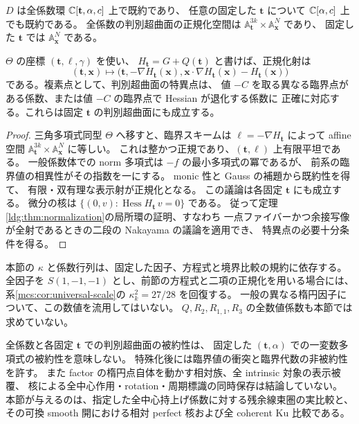 \begin{corollary}
\label{euk:cor:normalization}
$D$ は全係数環 $\mathbb C[\mathbf t,\alpha,c]$ 上で既約であり、
任意の固定した $\mathbf t$ について $\mathbb C[\alpha,c]$ 上でも既約である。
全係数の判別超曲面の正規化空間は
$\mathbb A^{3k}_{\mathbf t}\times\mathbb A^N_{\mathbf x}$ であり、
固定した $\mathbf t$ では $\mathbb A^N_{\mathbf x}$ である。

$\Theta$ の座標 $(\mathbf t,\ell,\gamma)$ を使い、
$H_{\mathbf t}=G+Q(\mathbf t)$ と書けば、正規化射は
\[
 (\mathbf t,\mathbf x)\longmapsto
 \bigl(\mathbf t,-\nabla H_{\mathbf t}(\mathbf x),
       \mathbf x\cdot\nabla H_{\mathbf t}(\mathbf x)-H_{\mathbf t}(\mathbf x)\bigr)
\]
である。複素点として、判別超曲面の特異点は、
値 $-C$ を取る異なる臨界点がある係数、または値 $-C$ の臨界点で Hessian が退化する係数に
正確に対応する。これらは固定 $\mathbf t$ の判別超曲面にも成立する。
\end{corollary}

\begin{proof}
三角多項式同型 $\Theta$ へ移すと、臨界スキームは
$\ell=-\nabla H_{\mathbf t}$ によって affine 空間
$\mathbb A^{3k}_{\mathbf t}\times\mathbb A^N_{\mathbf x}$ に等しい。
これは整かつ正規であり、$(\mathbf t,\ell)$ 上有限平坦である。
一般係数体での norm 多項式は $-f$ の最小多項式の冪であるが、
前系の臨界値の相異性がその指数を一にする。
monic 性と Gauss の補題から既約性を得て、
有限・双有理な表示射が正規化となる。
この議論は各固定 $\mathbf t$ にも成立する。
微分の核は $\{(0,v):\operatorname{Hess}H_{\mathbf t}\,v=0\}$ である。
従って定理\ref{ldg:thm:normalization}の局所環の証明、すなわち
一点ファイバーかつ余接写像が全射であるときの二段の Nakayama の議論を適用でき、
特異点の必要十分条件を得る。
\end{proof}

\begin{remark}[固定因子の比較の範囲]
\label{euk:rem:scope}
本節の $\kappa$ と係数行列は、固定した因子、方程式と境界比較の規約に依存する。
全因子を $S(1,-1,-1)$ とし、前節の方程式と二項の正規化を用いる場合には、
系\ref{mcs:cor:universal-scale}の $\kappa_k^2=27/28$ を回復する。
一般の異なる楕円因子について、この数値を流用してはいない。
$Q,R_2,R_{1,1},R_3$ の全数値係数も本節では求めていない。

全係数と各固定 $\mathbf t$ での判別超曲面の被約性は、
固定した $(\mathbf t,\alpha)$ での一変数多項式の被約性を意味しない。
特殊化後には臨界値の衝突と臨界代数の非被約性を許す。
また factor の楕円点自体を動かす相対族、全 intrinsic 対象の表示被覆、
核による全中心作用・rotation・周期標識の同時保存は結論していない。
本節が与えるのは、指定した全中心持上げ係数に対する残余線束圏の実比較と、
その可換 smooth 開における相対 perfect 核および全 coherent Ku 比較である。
\end{remark}
